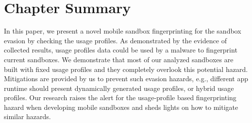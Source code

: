 \section{Chapter Summary}
In this paper, we present a novel  mobile sandbox fingerprinting for the sandbox evasion by checking the usage profiles. As demonstrated by the evidence of collected results, usage profiles data could be used by a malware to fingerprint current sandboxes. We demonstrate that most of our analyzed sandboxes are built with fixed usage profiles and they completely overlook this potential hazard. Mitigations are provided by us to prevent such evasion hazards, e.g., different app runtime should present dynamically generated usage profiles, or hybrid usage profiles. Our research raises the alert for the usage-profile based fingerprinting hazard when developing mobile sandboxes and sheds lights on how to mitigate similar hazards. 
